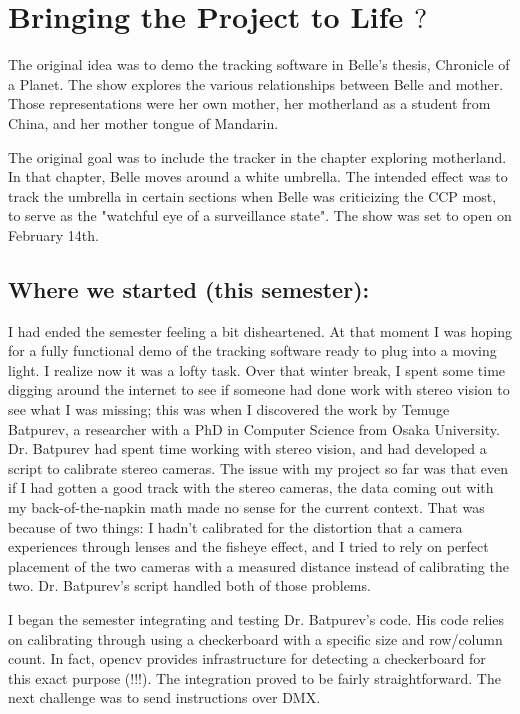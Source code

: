 \documentclass[12pt,twoside]{reedthesis}
\begin{document}
\chapter{Bringing the Project to Life \(?\)}
The original idea was to demo the tracking software in Belle's thesis, Chronicle of a Planet. The show explores the various relationships between Belle and mother. Those representations were her own mother, her motherland as a student from China, and her mother tongue of Mandarin.

The original goal was to include the tracker in the chapter exploring motherland. In that chapter, Belle moves around a white umbrella. The intended effect was to track the umbrella in certain sections when Belle was criticizing the CCP most, to serve as the "watchful eye of a surveillance state". The show was set to open on February 14th.

\section{Where we started (this semester):}

I had ended the semester feeling a bit disheartened. At that moment I was hoping for a fully functional demo of the tracking software ready to plug into a moving light. I realize now it was a lofty task. Over that winter break, I spent some time digging around the internet to see if someone had done work with stereo vision to see what I was missing; this was when I discovered the work by Temuge Batpurev, a researcher with a PhD in Computer Science from Osaka University. Dr. Batpurev had spent time working with stereo vision, and had developed a script to calibrate stereo cameras. The issue with my project so far was that even if I had gotten a good track with the stereo cameras, the data coming out with my back-of-the-napkin math made no sense for the current context. That was because of two things: I hadn't calibrated for the distortion that a camera experiences through lenses and the fisheye effect, and I tried to rely on perfect placement of the two cameras with a measured distance instead of calibrating the two. Dr. Batpurev's script handled both of those problems.

I began the semester integrating and testing Dr. Batpurev's code. His code relies on calibrating through using a checkerboard with a specific size and row/column count. In fact, opencv provides infrastructure for detecting a checkerboard for this exact purpose (!!!). The integration proved to be fairly straightforward. The next challenge was to send instructions over DMX.
\end{document}
